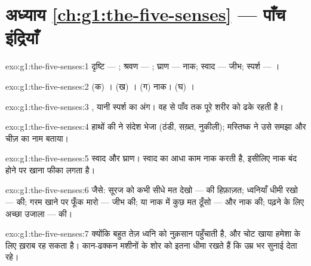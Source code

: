 \section*{अध्याय \ref{ch:g1:the-five-senses} --- पाँच इंद्रियाँ}

\begin{solution}{exo:g1:the-five-senses:1}
दृष्टि --- ; श्रवण --- ; घ्राण --- नाक; स्वाद --- जीभ;
स्पर्श --- ।
\end{solution}

\begin{solution}{exo:g1:the-five-senses:2}
(क) । (ख) । (ग) नाक। (घ) ।
\end{solution}

\begin{solution}{exo:g1:the-five-senses:3}
, यानी स्पर्श का अंग। वह  से पाँव तक पूरे शरीर को ढके रहती
है।
\end{solution}

\begin{solution}{exo:g1:the-five-senses:4}
हाथों की  ने संदेश भेजा (ठंडी, सख़्त, नुकीली); मस्तिष्क ने उसे
समझा और चीज़ का नाम बताया।
\end{solution}

\begin{solution}{exo:g1:the-five-senses:5}
स्वाद और घ्राण। स्वाद का आधा काम नाक करती है, इसीलिए नाक बंद होने पर
खाना फीका लगता है।
\end{solution}

\begin{solution}{exo:g1:the-five-senses:6}
जैसे: सूरज को कभी सीधे मत देखो ---  की हिफ़ाज़त; ध्वनियाँ धीमी
रखो ---  की; गरम खाने पर फूँक मारो --- जीभ की;  या नाक में
कुछ मत ठूँसो ---  और नाक की; पढ़ने के लिए अच्छा उजाला ---
 की।
\end{solution}

\begin{solution}{exo:g1:the-five-senses:7}
क्योंकि बहुत तेज़ ध्वनि  को नुक़सान पहुँचाती है, और चोट खाया 
हमेशा के लिए ख़राब रह सकता है। कान-ढक्कन मशीनों के शोर को इतना धीमा
रखते हैं कि उम्र भर सुनाई देता रहे।
\end{solution}

